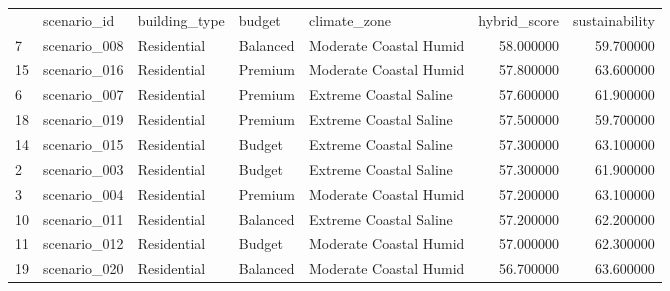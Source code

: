 \begin{tabular}{lllllrr}
 & scenario_id & building_type & budget & climate_zone & hybrid_score & sustainability \\
7 & scenario_008 & Residential & Balanced & Moderate Coastal Humid & 58.000000 & 59.700000 \\
15 & scenario_016 & Residential & Premium & Moderate Coastal Humid & 57.800000 & 63.600000 \\
6 & scenario_007 & Residential & Premium & Extreme Coastal Saline & 57.600000 & 61.900000 \\
18 & scenario_019 & Residential & Premium & Extreme Coastal Saline & 57.500000 & 59.700000 \\
14 & scenario_015 & Residential & Budget & Extreme Coastal Saline & 57.300000 & 63.100000 \\
2 & scenario_003 & Residential & Budget & Extreme Coastal Saline & 57.300000 & 61.900000 \\
3 & scenario_004 & Residential & Premium & Moderate Coastal Humid & 57.200000 & 63.100000 \\
10 & scenario_011 & Residential & Balanced & Extreme Coastal Saline & 57.200000 & 62.200000 \\
11 & scenario_012 & Residential & Budget & Moderate Coastal Humid & 57.000000 & 62.300000 \\
19 & scenario_020 & Residential & Balanced & Moderate Coastal Humid & 56.700000 & 63.600000 \\
\end{tabular}
